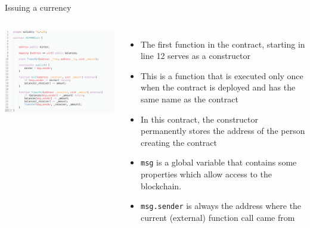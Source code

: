 \documentclass[11pt]{beamer}
\begin{document}
\begin{frame}{Issuing a currency}
	\begin{columns}
	    \includegraphics  [scale=0.3]{Images/contract_new}

	    \begin{itemize}
			\item The first function in the contract, starting in line 12 serves as a constructor
			\item This is a function that is executed only once when the contract is deployed and has the same name as the contract
			\item In this contract, the constructor permanently stores the address of the person creating the contract
			\item \texttt{msg} is a global variable that contains some properties which allow access to the blockchain.
			\item \texttt{msg.sender} is always the address where the current (external) function call came from
	    \end{itemize}
	\end{columns}
\end{frame}

\end{document}
